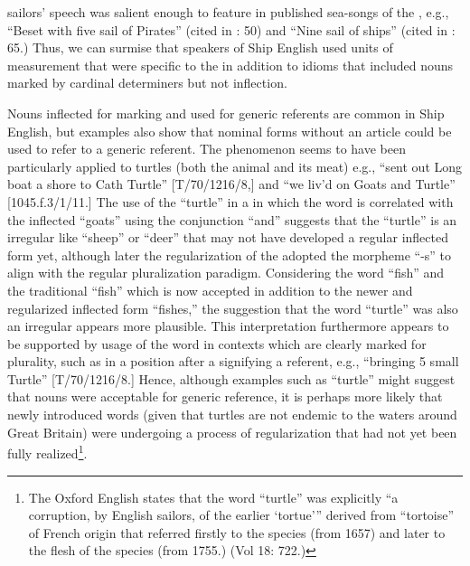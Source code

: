 sailors’ speech was salient enough to feature in published sea-songs of the , e.g., “Beset with five sail of Pirates” (cited in \citealt{Palmer1986}: 50) and “Nine sail of ships” (cited in \citealt{Palmer1986}: 65.) Thus, we can surmise that speakers of Ship English used   units of measurement that were specific to the  in addition to idioms that included  nouns marked by cardinal determiners but not inflection. 

Nouns inflected for  marking and used for generic referents are common in Ship English, but examples also show that  nominal forms without an article could be used to refer to a generic referent. The phenomenon seems to have been particularly applied to turtles (both the animal and its meat) e.g., “sent out Long boat a shore to Cath Turtle” [T/70/1216/8,] and “we liv’d on Goats and Turtle” [1045.f.3/1/11.] The use of the   “turtle” in a  in which the word is correlated with the inflected  “goats” using the conjunction “and” suggests that the  “turtle” is an irregular  like “sheep” or “deer” that may not have developed a regular inflected form yet, although later the regularization of the  adopted the morpheme “-s” to align with the regular pluralization paradigm. Considering the word “fish” and the traditional   “fish” which is now accepted in addition to the newer and regularized inflected form “fishes,” the suggestion that the word “turtle” was also an irregular  appears more plausible. This interpretation furthermore appears to be supported by usage of the word in contexts which are clearly marked for plurality, such as in a position after a  signifying a  referent, e.g., “bringing 5 small Turtle” [T/70/1216/8.] Hence, although examples such as “turtle” might suggest that  nouns were acceptable for generic reference, it is perhaps more likely that newly introduced words (given that turtles are not endemic to the waters around Great Britain) were undergoing a process of regularization that had not yet been fully realized\footnote{The Oxford English \citet{Dictionary1989} states that the word “turtle” was explicitly “a corruption, by English sailors, of the earlier ‘tortue’” derived from “tortoise” of French origin that referred firstly to the species (from 1657) and later to the flesh of the species (from 1755.) (Vol 18: 722.)}. 

